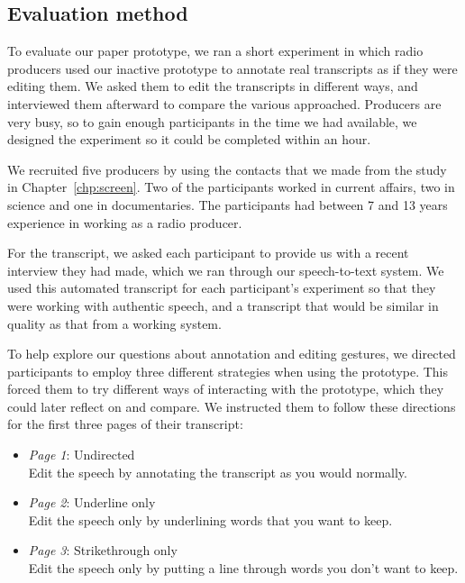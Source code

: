 \subsection{Evaluation method}




To evaluate our paper prototype, we ran a short experiment in which radio producers used our inactive prototype to
annotate real transcripts as if they were editing them.  We asked them to edit the transcripts in different ways, and
interviewed them afterward to compare the various approached. Producers are very busy, so to gain enough participants
in the time we had available, we designed the experiment so it could be completed within an hour.

We recruited five producers by using the contacts that we made from the study in Chapter~\ref{chp:screen}. Two of the
participants worked in current affairs, two in science and one in documentaries.  The participants had between 7 and 13
years experience in working as a radio producer.

For the transcript, we asked each participant to provide us with a recent interview they had made, which we ran through
our speech-to-text system. We used this automated transcript for each participant's experiment so that they were
working with authentic speech, and a transcript that would be similar in quality as that from a working system.

To help explore our questions about annotation and editing gestures, we directed participants to employ three different
strategies when using the prototype. This forced them to try different ways of interacting with the prototype,
which they could later reflect on and compare. We instructed them to follow these directions for the first three
pages of their transcript: 

\begin{itemize}
  \item \textit{Page 1}: Undirected\\Edit the speech by annotating the transcript as you would normally.
  \item \textit{Page 2}: Underline only\\Edit the speech only by underlining words that you want to keep.
  \item \textit{Page 3}: Strikethrough only\\Edit the speech only by putting a line through words you don't want to keep.
\end{itemize}

